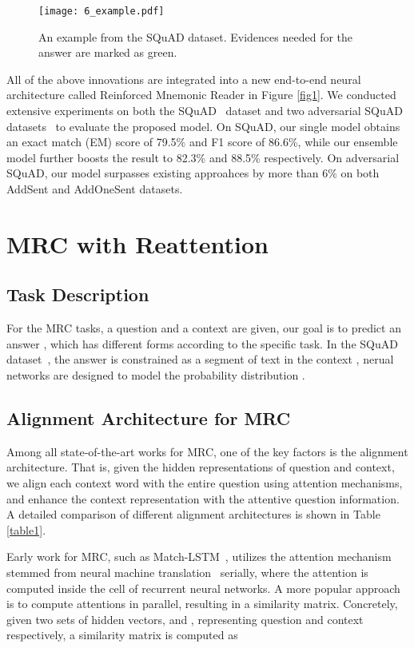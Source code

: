 \documentclass{article}
\begin{document}
\begin{figure}
\begin{center}
\texttt{[image: 6\_example.pdf]}
\end{center}
\caption{An example from the SQuAD dataset. Evidences needed for the answer are marked as green.}
\label{fig4}
\end{figure}

All of the above innovations are integrated into a new end-to-end neural architecture called Reinforced Mnemonic Reader in Figure \ref{fig1}.
We conducted extensive experiments on both the SQuAD~\cite{Rajpurkar16} dataset and two adversarial SQuAD datasets~\cite{Jia17} to evaluate the proposed model. On SQuAD, our single model obtains an exact match (EM) score of 79.5\% and F1 score of 86.6\%, while our ensemble model further boosts the result to 82.3\% and 88.5\% respectively. 
On adversarial SQuAD, our model surpasses existing approahces by more than 6\% on both AddSent and AddOneSent datasets.
 \section{MRC with Reattention}
\subsection{Task Description}
For the MRC tasks, a question  and a context  are given, our goal is to predict an answer , which has different forms according to the specific task. In the SQuAD dataset~\cite{Rajpurkar16}, the answer  is constrained as a segment of text in the context , nerual networks are designed to model the probability distribution . 


\subsection{Alignment Architecture for MRC}
Among all state-of-the-art works for MRC, one of the key factors is the alignment architecture.
That is, given the hidden representations of question and context, we align each context word with the entire question using attention mechanisms, and enhance the context representation with the attentive question information. 
A detailed comparison of different alignment architectures is shown in Table \ref{table1}.

Early work for MRC, such as Match-LSTM~\cite{Wang17a}, utilizes the attention mechanism stemmed from neural machine translation~\cite{Bahdanau15} serially, where the attention is computed inside the cell of recurrent neural networks.
A more popular approach is to compute attentions in parallel, resulting in a similarity matrix. 
Concretely, given two sets of hidden vectors,  and , representing question and context respectively, a similarity matrix  is computed as
\end{document}
